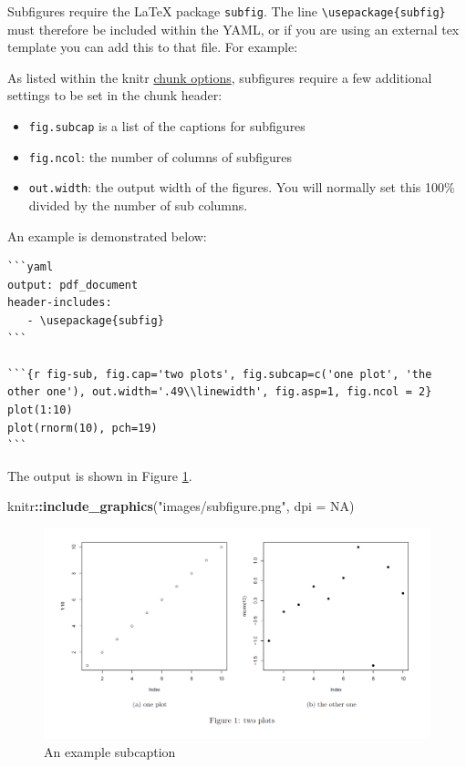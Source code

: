\documentclass[]{book}
\newenvironment{Shaded}{\begin{snugshade}}{\end{snugshade}}
\newcommand{\KeywordTok}[1]{\textcolor[rgb]{0.13,0.29,0.53}{\textbf{#1}}}
\newcommand{\DataTypeTok}[1]{\textcolor[rgb]{0.13,0.29,0.53}{#1}}
\newcommand{\StringTok}[1]{\textcolor[rgb]{0.31,0.60,0.02}{#1}}
\newcommand{\OtherTok}[1]{\textcolor[rgb]{0.56,0.35,0.01}{#1}}
\newcommand{\OperatorTok}[1]{\textcolor[rgb]{0.81,0.36,0.00}{\textbf{#1}}}
\newcommand{\NormalTok}[1]{#1}
\providecommand{\tightlist}{%
  \setlength{\itemsep}{0pt}\setlength{\parskip}{0pt}}
\begin{document}
Subfigures require the LaTeX package \texttt{subfig}. The line
\texttt{\textbackslash{}usepackage\{subfig\}} must therefore be included
within the YAML, or if you are using an external tex template you can
add this to that file. For example:

As listed within the knitr
\href{https://yihui.name/knitr/options/}{chunk options}, subfigures
require a few additional settings to be set in the chunk header:

\begin{itemize}
\tightlist
\item
  \texttt{fig.subcap} is a list of the captions for subfigures
\item
  \texttt{fig.ncol}: the number of columns of subfigures
\item
  \texttt{out.width}: the output width of the figures. You will normally
  set this 100\% divided by the number of sub columns.
\end{itemize}

An example is demonstrated below:

\begin{verbatim}
```yaml
output: pdf_document
header-includes:
   - \usepackage{subfig}
```

```{r fig-sub, fig.cap='two plots', fig.subcap=c('one plot', 'the other one'), out.width='.49\\linewidth', fig.asp=1, fig.ncol = 2}
plot(1:10)
plot(rnorm(10), pch=19)
```
\end{verbatim}

The output is shown in Figure \ref{fig:subcaptions}.

\begin{Shaded}
\begin{Highlighting}[]
\NormalTok{knitr}\OperatorTok{::}\KeywordTok{include_graphics}\NormalTok{(}\StringTok{"images/subfigure.png"}\NormalTok{, }\DataTypeTok{dpi =} \OtherTok{NA}\NormalTok{)}
\end{Highlighting}
\end{Shaded}

\begin{figure}
\centering
\includegraphics{images/subfigure.png}
\caption{\label{fig:subcaptions}An example subcaption}
\end{figure}
\end{document}
